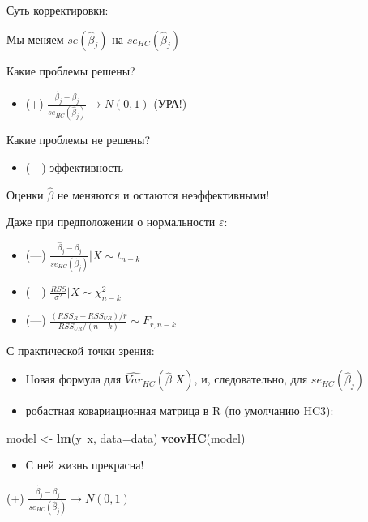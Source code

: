 \documentclass[ignorenonframetext,]{beamer}
\newenvironment{Shaded}{\begin{snugshade}}{\end{snugshade}}
\newcommand{\KeywordTok}[1]{\textcolor[rgb]{0.13,0.29,0.53}{\textbf{{#1}}}}
\newcommand{\DataTypeTok}[1]{\textcolor[rgb]{0.13,0.29,0.53}{{#1}}}
\newcommand{\StringTok}[1]{\textcolor[rgb]{0.31,0.60,0.02}{{#1}}}
\newcommand{\NormalTok}[1]{{#1}}
\begin{document}
\begin{frame}{Суть корректировки:}

Мы меняем \(se(\hat{\beta}_j)\) на \(se_{HC}(\hat{\beta}_j)\)

Какие проблемы решены?

\begin{itemize}
\itemsep1pt\parskip0pt
\item
  (+)
  \(\frac{\hat{\beta}_j-\beta_j}{se_{HC}(\hat{\beta}_j)} \to N(0,1)\)
  (УРА!)
\end{itemize}

\end{frame}

\begin{frame}{Какие проблемы не решены?}

\begin{itemize}
\itemsep1pt\parskip0pt
\item
  (---) эффективность
\end{itemize}

Оценки \(\hat{\beta}\) не меняются и остаются неэффективными!

Даже при предположении о нормальности \(\varepsilon\):

\begin{itemize}
\item
  (---)
  \(\frac{\hat{\beta}_j-\beta_j}{se_{HC}(\hat{\beta}_j)} | X \sim t_{n-k}\)
\item
  (---) \(\frac{RSS}{\sigma^2} |X \sim \chi^2_{n-k}\)
\item
  (---) \(\frac{(RSS_R-RSS_{UR})/r}{RSS_{UR}/(n-k)} \sim F_{r,n-k}\)
\end{itemize}

\end{frame}

\begin{frame}[fragile]{С практической точки зрения:}

\begin{itemize}
\item
  Новая формула для \(\widehat{Var}_{HC}(\hat{\beta}|X)\), и,
  следовательно, для \(se_{HC}(\hat{\beta}_j)\)
\item
  робастная ковариационная матрица в R (по умолчанию HC3):
\end{itemize}

\begin{Shaded}
\begin{Highlighting}[]
\NormalTok{model <-}\StringTok{ }\KeywordTok{lm}\NormalTok{(y~x, }\DataTypeTok{data=}\NormalTok{data)}
\KeywordTok{vcovHC}\NormalTok{(model)}
\end{Highlighting}
\end{Shaded}

\begin{itemize}
\itemsep1pt\parskip0pt
\item
  С ней жизнь прекрасна!
\end{itemize}

(+) \(\frac{\hat{\beta}_j-\beta_j}{se_{HC}(\hat{\beta}_j)} \to N(0,1)\)

\end{frame}
\end{document}
